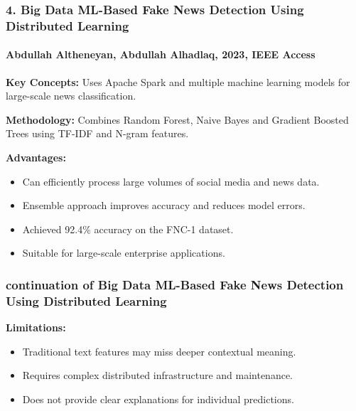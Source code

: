\documentclass{beamer}
\begin{document}
\begin{frame}
\frametitle{4. Big Data ML-Based Fake News Detection Using Distributed Learning}
\framesubtitle{Abdullah Altheneyan, Abdullah Alhadlaq, 2023, IEEE Access}
\small{
\textbf{Key Concepts:} Uses Apache Spark and multiple machine learning models for large-scale news classification. \par\vspace{0.15cm}
\textbf{Methodology:} Combines Random Forest, Naive Bayes and Gradient Boosted Trees using TF-IDF and N-gram features. \par\vspace{0.15cm}
\textbf{Advantages:}
\begin{itemize}
    \item Can efficiently process large volumes of social media and news data.
    \item Ensemble approach improves accuracy and reduces model errors.
    \item Achieved 92.4\% accuracy on the FNC-1 dataset.
    \item Suitable for large-scale enterprise applications.
\end{itemize}
}
\end{frame}

\begin{frame}
\frametitle{continuation of Big Data ML-Based Fake News Detection Using Distributed Learning}
\large{
\textbf{Limitations:}
\begin{itemize}
    \item Traditional text features may miss deeper contextual meaning.
    \item Requires complex distributed infrastructure and maintenance.
    \item Does not provide clear explanations for individual predictions.
\end{itemize}
}
\end{frame}
\end{document}
